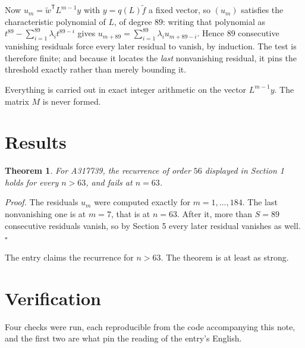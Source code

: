\documentclass[11pt]{article}
\newtheorem{theorem}{Theorem}
\theoremstyle{definition}
\begin{document}
Now $u_m = \tilde w^{\mathsf T} L^{m-1} y$ with $y = q(L)\tilde f$ a fixed vector, so $(u_m)$ satisfies the characteristic polynomial of $L$, of degree $89$: writing that polynomial as $t^{89} - \sum_{i=1}^{89} \lambda_i t^{89-i}$ gives $u_{m+89} = \sum_{i=1}^{89} \lambda_i u_{m+89-i}$. Hence $89$ consecutive vanishing residuals force every later residual to vanish, by induction. The test is therefore finite; and because it locates the {\itshape last} nonvanishing residual, it pins the threshold exactly rather than merely bounding it.

Everything is carried out in exact integer arithmetic on the vector $L^{m-1}y$. The matrix $M$ is never formed.

\section{Results}

\begin{theorem} For A317739, the recurrence of order $56$ displayed in Section 1 holds for every $n > 63$, and fails at $n = 63$.\end{theorem}

{\itshape Proof.} The residuals $u_m$ were computed exactly for $m = 1,\dots,184$. The last nonvanishing one is at $m = 7$, that is at $n = 63$. After it, more than $S = 89$ consecutive residuals vanish, so by Section 5 every later residual vanishes as well. $\square$

The entry claims the recurrence for $n > 63$. The theorem is at least as strong.

\section{Verification}

Four checks were run, each reproducible from the code accompanying this note, and the first two are what pin the reading of the entry's English.
\end{document}
